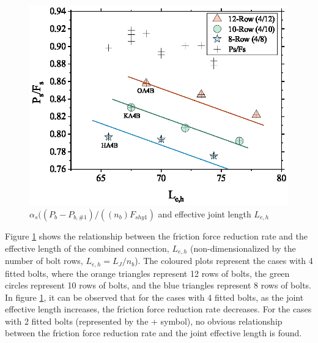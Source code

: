 \begin{figure}
    \centering
    \includegraphics[width=\linewidth]{imgs/ch7/as-leh.eps}
    \caption{ $\alpha_s ((P_b-P_{b,\#1})/((n_b)F_{shy1})$ and effective joint length $L_{e,h}$}
    \label{fig-rdc-leh}
\end{figure}

Figure \ref{fig-rdc-leh} shows the relationship between the friction force reduction rate and the effective length of the combined connection, $L_{e,h}$ (non-dimensionalized by the number of bolt rows, $L_{e,h} = L_J / n_b$). The coloured plots represent the cases with 4 fitted bolts, where the orange triangles represent 12 rows of bolts, the green circles represent 10 rows of bolts, and the blue triangles represent 8 rows of bolts. In figure \ref{fig-rdc-leh}, it can be observed that for the cases with 4 fitted bolts, as the joint effective length increases, the friction force reduction rate decreases. For the cases with 2 fitted bolts (represented by the + symbol), no obvious relationship between the friction force reduction rate and the joint effective length is found. 

